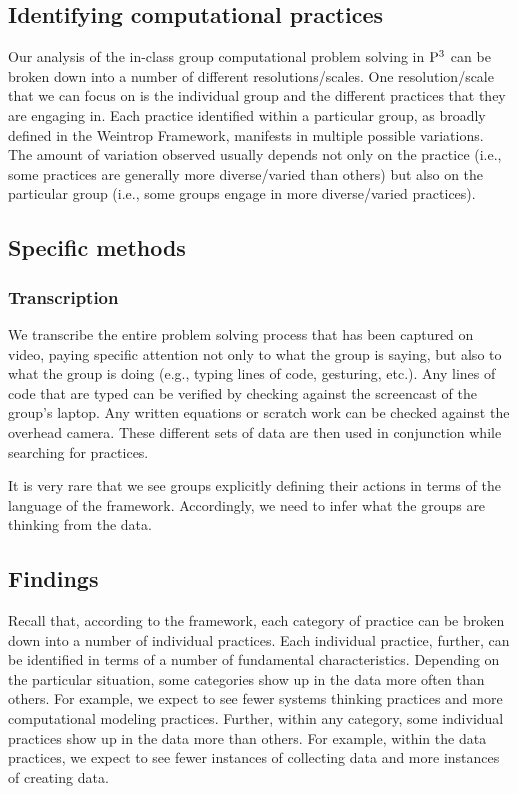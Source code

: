 \documentclass{msuphddissertation}
\begin{document}
\begin{doublespace}
%
%

\chapter{Identifying computational practices}

Our analysis of the in-class group computational problem solving in ${\rm P}^{3}$ can be broken down into a number of different resolutions/scales.  One resolution/scale that we can focus on is the individual group and the different practices that they are engaging in.  Each practice identified within a particular group, as broadly defined in the Weintrop Framework, manifests in multiple possible variations.  The amount of variation observed usually depends not only on the practice (i.e., some practices are generally more diverse/varied than others) but also on the particular group (i.e., some groups engage in more diverse/varied practices).

\section{Specific methods}

\subsection{Transcription}

We transcribe the entire problem solving process that has been captured on video, paying specific attention not only to what the group is saying, but also to what the group is doing (e.g., typing lines of code, gesturing, etc.).  Any lines of code that are typed can be verified by checking against the screencast of the group's laptop.  Any written equations or scratch work can be checked against the overhead camera.  These different sets of data are then used in conjunction while searching for practices. 

It is very rare that we see groups explicitly defining their actions in terms of the language of the framework.  Accordingly, we need to infer what the groups are thinking from the data.

\section{Findings}

Recall that, according to the framework, each category of practice can be broken down into a number of individual practices.  Each individual practice, further, can be identified in terms of a number of fundamental characteristics.  Depending on the particular situation, some categories show up in the data more often than others.  For example, we expect to see fewer systems thinking practices and more computational modeling practices.  Further, within any category, some individual practices show up in the data more than others.  For example, within the data practices, we expect to see fewer instances of collecting data and more instances of creating data.


\end{doublespace}
\end{document}
